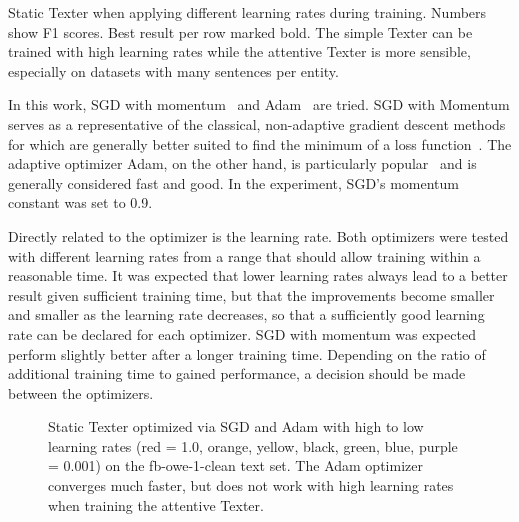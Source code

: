 
\begin{table}[t]
    \centering
    
    \caption{Static Texter when applying different learning rates during training. Numbers show F1 scores. Best result per row marked bold. The simple Texter can be trained with high learning rates while the attentive Texter is more sensible, especially on datasets with many sentences per entity.}
    \label{tab:5_experiments/3_texter/2_static/8_optimizer/grid_search}
\end{table}

In this work, SGD with momentum~\cite{Qian1999OnTM} and Adam~\cite{Kingma2015AdamAM} are tried. SGD with Momentum serves as a representative of the classical, non-adaptive gradient descent methods for which are generally better suited to find the minimum of a loss function~\cite{Wilson2017TheMV}. The adaptive optimizer Adam, on the other hand, is particularly popular~\cite{AdamPopular} and is generally considered fast and good. In the experiment, SGD's momentum constant was set to 0.9.

Directly related to the optimizer is the learning rate. Both optimizers were tested with different learning rates from a range that should allow training within a reasonable time. It was expected that lower learning rates always lead to a better result given sufficient training time, but that the improvements become smaller and smaller as the learning rate decreases, so that a sufficiently good learning rate can be declared for each optimizer. SGD with momentum was expected perform slightly better after a longer training time. Depending on the ratio of additional training time to gained performance, a decision should be made between the optimizers.

\begin{figure}[t]
    \centering
    
    \caption{Static Texter optimized via SGD and Adam with high to low learning rates (red = 1.0, orange, yellow, black, green, blue, purple = 0.001) on the fb-owe-1-clean text set. The Adam optimizer converges much faster, but does not work with high learning rates when training the attentive Texter.}
    \label{fig:5_experiments/3_texter/2_static/8_optimizer/sgd_vs_adam/sgd_vs_adam}
\end{figure}


